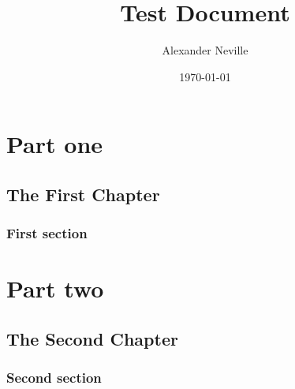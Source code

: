 \documentclass[10pt]{report}
\title{Test Document}
\author{Alexander Neville}
\date{\today}
\begin{document}
\pagestyle{empty}
\maketitle
\pagestyle{fancy}
\part{Part one}
\chapter{The First Chapter}
\blindtext
\section{First section}
\blindtext
\part{Part two}
\chapter{The Second Chapter}
\blindtext
\section{Second section}
\blindtext
\end{document}
